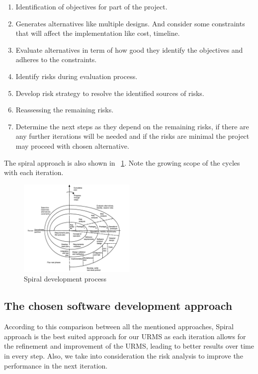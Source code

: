 \documentclass[conference,onecolumn]{IEEEtran}
\begin{document}
\begin{enumerate}
	\item Identification of objectives for part of the project.
	\item Generates alternatives like multiple designs. And consider some constraints that will affect the implementation like cost, timeline.
	\item Evaluate alternatives in term of how good they identify the objectives and adheres to the constraints.
	\item Identify risks during evaluation process.
	\item Develop risk strategy to resolve the identified sources of risks.
	\item Reassessing the remaining risks.
	\item Determine the next steps as they depend on the remaining risks, if there are any further iterations will be needed and if the risks are minimal the project may proceed with chosen alternative.
\end{enumerate}

The spiral approach is also shown in \figurename~\ref{fig:spiral}. Note the growing scope of the cycles with each iteration.

\begin{figure}[htb]
	\centering
	\includegraphics[width=0.5\textwidth]{Figures/Spiral.png}
	\caption{Spiral development process}
	\label{fig:spiral}
\end{figure}

\subsection{The chosen software development approach}

According to this comparison between all the mentioned approaches, Spiral approach is the best suited approach for our URMS as each iteration allows for the refinement and improvement of the URMS, leading to better results over time in every step. Also, we take into consideration the risk analysis to improve the performance in the next iteration.
\end{document}

